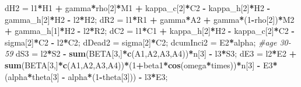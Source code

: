 \documentclass[
]{article}
\newenvironment{Shaded}{\begin{snugshade}}{\end{snugshade}}
\newcommand{\CommentTok}[1]{\textcolor[rgb]{0.56,0.35,0.01}{\textit{#1}}}
\newcommand{\DecValTok}[1]{\textcolor[rgb]{0.00,0.00,0.81}{#1}}
\newcommand{\KeywordTok}[1]{\textcolor[rgb]{0.13,0.29,0.53}{\textbf{#1}}}
\newcommand{\NormalTok}[1]{#1}
\newcommand{\OperatorTok}[1]{\textcolor[rgb]{0.81,0.36,0.00}{\textbf{#1}}}
\newcommand{\StringTok}[1]{\textcolor[rgb]{0.31,0.60,0.02}{#1}}
\begin{document}
\begin{Shaded}
\begin{Highlighting}[]
\NormalTok{    dH2 =}\StringTok{ }\NormalTok{l1}\OperatorTok{*}\NormalTok{H1 }\OperatorTok{+}\StringTok{ }\NormalTok{gamma}\OperatorTok{*}\NormalTok{rho[}\DecValTok{2}\NormalTok{]}\OperatorTok{*}\NormalTok{M1 }\OperatorTok{+}\StringTok{ }\NormalTok{kappa_c[}\DecValTok{2}\NormalTok{]}\OperatorTok{*}\NormalTok{C2 }\OperatorTok{-}\StringTok{ }\NormalTok{kappa_h[}\DecValTok{2}\NormalTok{]}\OperatorTok{*}\NormalTok{H2 }\OperatorTok{-}\StringTok{ }\NormalTok{gamma_h[}\DecValTok{2}\NormalTok{]}\OperatorTok{*}\NormalTok{H2 }\OperatorTok{-}\StringTok{ }\NormalTok{l2}\OperatorTok{*}\NormalTok{H2;}
\NormalTok{    dR2 =}\StringTok{ }\NormalTok{l1}\OperatorTok{*}\NormalTok{R1 }\OperatorTok{+}\StringTok{ }\NormalTok{gamma}\OperatorTok{*}\NormalTok{A2 }\OperatorTok{+}\StringTok{ }\NormalTok{gamma}\OperatorTok{*}\NormalTok{(}\DecValTok{1}\OperatorTok{-}\NormalTok{rho[}\DecValTok{2}\NormalTok{])}\OperatorTok{*}\NormalTok{M2 }\OperatorTok{+}\StringTok{ }\NormalTok{gamma_h[}\DecValTok{1}\NormalTok{]}\OperatorTok{*}\NormalTok{H2 }\OperatorTok{-}\StringTok{ }\NormalTok{l2}\OperatorTok{*}\NormalTok{R2;}
\NormalTok{    dC2 =}\StringTok{ }\NormalTok{l1}\OperatorTok{*}\NormalTok{C1 }\OperatorTok{+}\StringTok{ }\NormalTok{kappa_h[}\DecValTok{2}\NormalTok{]}\OperatorTok{*}\NormalTok{H2 }\OperatorTok{-}\StringTok{ }\NormalTok{kappa_c[}\DecValTok{2}\NormalTok{]}\OperatorTok{*}\NormalTok{C2 }\OperatorTok{-}\StringTok{ }\NormalTok{sigma[}\DecValTok{2}\NormalTok{]}\OperatorTok{*}\NormalTok{C2 }\OperatorTok{-}\StringTok{ }\NormalTok{l2}\OperatorTok{*}\NormalTok{C2;}
\NormalTok{    dDead2 =}\StringTok{ }\NormalTok{sigma[}\DecValTok{2}\NormalTok{]}\OperatorTok{*}\NormalTok{C2;}
\NormalTok{    dcumInci2 =}\StringTok{ }\NormalTok{E2}\OperatorTok{*}\NormalTok{alpha;}
  \CommentTok{#age 30-59}
\NormalTok{    dS3 =}\StringTok{ }\NormalTok{l2}\OperatorTok{*}\NormalTok{S2 }\OperatorTok{-}\StringTok{ }\KeywordTok{sum}\NormalTok{(BETA[}\DecValTok{3}\NormalTok{,]}\OperatorTok{*}\KeywordTok{c}\NormalTok{(A1,A2,A3,A4))}\OperatorTok{*}\NormalTok{n[}\DecValTok{3}\NormalTok{] }\OperatorTok{-}\StringTok{ }\NormalTok{l3}\OperatorTok{*}\NormalTok{S3;}
\NormalTok{    dE3 =}\StringTok{ }\NormalTok{l2}\OperatorTok{*}\NormalTok{E2 }\OperatorTok{+}\StringTok{ }\KeywordTok{sum}\NormalTok{(BETA[}\DecValTok{3}\NormalTok{,]}\OperatorTok{*}\KeywordTok{c}\NormalTok{(A1,A2,A3,A4))}\OperatorTok{*}\NormalTok{(}\DecValTok{1}\OperatorTok{+}\NormalTok{beta1}\OperatorTok{*}\KeywordTok{cos}\NormalTok{(omega}\OperatorTok{*}\NormalTok{times))}\OperatorTok{*}\NormalTok{n[}\DecValTok{3}\NormalTok{] }\OperatorTok{-}\StringTok{ }\NormalTok{E3}\OperatorTok{*}\NormalTok{(alpha}\OperatorTok{*}\NormalTok{theta[}\DecValTok{3}\NormalTok{] }\OperatorTok{-}\StringTok{ }\NormalTok{alpha}\OperatorTok{*}\NormalTok{(}\DecValTok{1}\OperatorTok{-}\NormalTok{theta[}\DecValTok{3}\NormalTok{])) }\OperatorTok{-}\StringTok{ }\NormalTok{l3}\OperatorTok{*}\NormalTok{E3;}

\end{Highlighting}
\end{Shaded}
\end{document}

